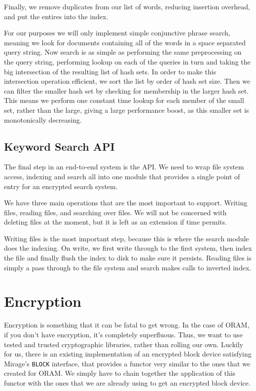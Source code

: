 \documentclass[12pt,a4paper,twoside,openright]{report}
\begin{document}
Finally, we remove duplicates from our list of words, reducing insertion overhead, and put the entires into the index.

For our purposes we will only implement simple conjunctive phrase search, meaning we look for documents containing all of the words in a space separated query string. Now search is as simple as performing the same preprocessing on the query string, performing lookup on each of the queries in turn and taking the big intersection of the resulting list of hash sets. In order to make this intersection operation efficient, we sort the list by order of hash set size. Then we can filter the smaller hash set by checking for membership in the larger hash set. This means we perform one constant time lookup for each member of the small set, rather than the large, giving a large performance boost, as this smaller set is monotonically decreasing.

\subsection{Keyword Search API}
\label{subsec:searchapi}

The final step in an end-to-end system is the API. We need to wrap file system access, indexing and search all into one module that provides a single point of entry for an encrypted search system.

We have three main operations that are the most important to support. Writing files, reading files, and searching over files. We will not be concerned with deleting files at the moment, but it is left as an extension if time permits.

Writing files is the most important step, because this is where the search module does the indexing. On write, we first write through to the first system, then index the file and finally flush the index to disk to make sure it persists. Reading files is simply a pass through to the file system and search makes calls to inverted index.

\section{Encryption}
\label{sec:encryption}

Encryption is something that it can be fatal to get wrong. In the case of ORAM, if you don't have encryption, it's completely superfluous. Thus, we want to use tested and trusted cryptographic libraries, rather than rolling our own. Luckily for us, there is an existing implementation of an encrypted block device satisfying Mirage's \texttt{BLOCK} interface, that provides a functor very similar to the ones that we created for ORAM. We simply have to chain together the application of this functor with the ones that we are already using to get an encrypted block device.
\end{document}

